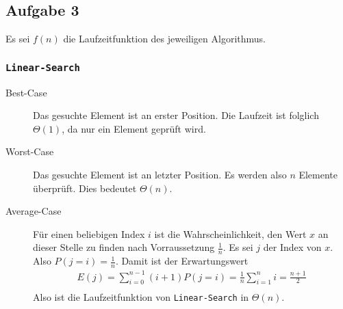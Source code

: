 \documentclass[11pt]{article}
\begin{document}
\subsection*{Aufgabe 3}
%
Es sei $f(n)$ die Laufzeitfunktion des jeweiligen Algorithmus.
  \subsubsection*{\texttt{Linear-Search}}
    \begin{description}
      \item[Best-Case] Das gesuchte Element ist an erster Position. Die Laufzeit
        ist folglich $\Theta(1)$, da nur ein Element gepr\"uft wird.

      \item[Worst-Case] Das gesuchte Element ist an letzter Position. Es werden
        also $n$ Elemente \"uberpr\"uft. Dies bedeutet $\Theta(n)$.
        
      \item[Average-Case] 
        F\"ur einen beliebigen Index $i$ ist die Wahrscheinlichkeit, den 
        Wert $x$ an dieser Stelle zu finden nach Vorraussetzung $\frac{1}{n}$.
        Es sei $j$ der Index von $x$.  Also $P(j=i) = \frac{1}{n}$. 
        Damit ist der Erwartungswert 
        \begin{align*}
          E(j)  = \sum_{i=0}^{n-1} (i + 1) P(j=i) = \frac{1}{n} \sum_{i=1}^{n} i 
                                                  = \frac{n + 1}{2} \\
        \end{align*}
        Also ist die Laufzeitfunktion von \texttt{Linear-Search} in 
        $\Theta(n)$.

    \end{description}
\end{document}
